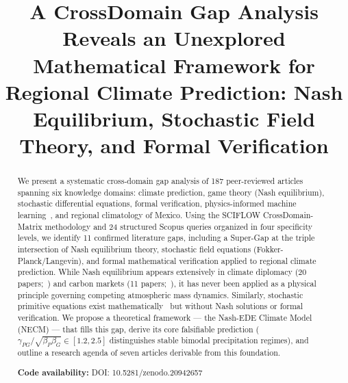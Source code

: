 \documentclass[gmd, manuscript]{copernicus}
\begin{document}
\title{A CrossDomain Gap Analysis Reveals an Unexplored Mathematical
Framework for Regional Climate Prediction: Nash Equilibrium,
Stochastic Field Theory, and Formal Verification}







\received{}
\pubdiscuss{}
\revised{}
\accepted{}
\published{}


\maketitle



\maketitle

\begin{abstract}
We present a systematic cross-domain gap analysis of 187 peer-reviewed
articles spanning six knowledge domains: climate prediction, game theory
(Nash equilibrium), stochastic differential equations, formal verification,
physics-informed machine learning~\citep{Raissi2019, LeCun2015}, and regional climatology of Mexico.
Using the SCIFLOW CrossDomain-Matrix methodology and 24 structured Scopus
queries organized in four specificity levels, we identify 11 confirmed
literature gaps, including a Super-Gap at the triple intersection of
Nash equilibrium theory, stochastic field equations (Fokker-Planck/Langevin),
and formal mathematical verification applied to regional climate prediction.
While Nash equilibrium appears extensively in climate diplomacy (20 papers;~\citep{Forgo2005})
and carbon markets (11 papers;~\citep{Haurie2004}), it has never been applied as a physical
principle governing competing atmospheric mass dynamics. Similarly,
stochastic primitive equations exist mathematically~\citep{Debussche2012, Guo2021} \citep{Debussche2012, Majda2006} but without Nash solutions or formal verification.
We propose a theoretical framework --- the Nash-EDE Climate Model (NECM) ---
that fills this gap, derive its core falsifiable prediction
($\gamma_{PG}/\sqrt{\beta_P\beta_G} \in [1.2, 2.5]$ distinguishes
stable bimodal precipitation regimes), and outline a research agenda
of seven articles derivable from this foundation.

\noindent\textbf{Code availability:} DOI: 10.5281/zenodo.20942657
\end{abstract}
\end{document}
